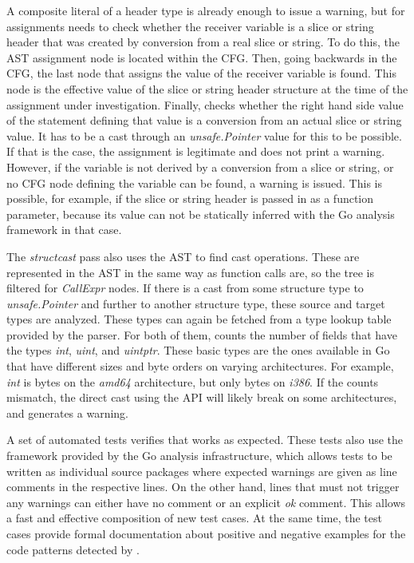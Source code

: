 

A composite literal of a header type is already enough to issue a warning, but for assignments \toolSafer{} needs to
check whether the receiver variable is a slice or string header that was created by conversion from a real slice or
string.
To do this, the \acrshort{AST} assignment node is located within the \acrshort{CFG}.
Then, going backwards in the \acrshort{CFG}, the last node that assigns the value of the receiver variable is found.
This node is the effective value of the slice or string header structure at the time of the assignment under
investigation.
Finally, \toolSafer{} checks whether the right hand side value of the statement defining that value is a conversion
from an actual slice or string value.
It has to be a cast through an \textit{unsafe.Pointer} value for this to be possible.
If that is the case, the assignment is legitimate and \toolSafer{} does not print a warning.
However, if the variable is not derived by a conversion from a slice or string, or no \acrshort{CFG} node defining the
variable can be found, a warning is issued.
This is possible, for example, if the slice or string header is passed in as a function parameter, because
its value can not be statically inferred with the Go analysis framework in that case.

The \textit{structcast} pass also uses the \acrshort{AST} to find cast operations.
These are represented in the \acrshort{AST} in the same way as function calls are, so the tree is filtered for
\textit{CallExpr} nodes.
If there is a cast from some structure type to \textit{unsafe.Pointer} and further to another structure type, these
source and target types are analyzed.
These types can again be fetched from a type lookup table provided by the parser.
For both of them, \toolSafer{} counts the number of fields that have the types \textit{int}, \textit{uint}, and
\textit{uintptr}.
These  basic types are the ones available in Go that have different sizes and byte orders on varying
architectures.
For example, \textit{int} is  bytes on the \textit{amd64} architecture, but only  bytes
on \textit{i386}.
If the counts mismatch, the direct cast using the \unsafe{} \acrshort{API} will likely break on some architectures,
and \toolSafer{} generates a warning.

A set of automated tests verifies that \toolSafer{} works as expected.
These tests also use the framework provided by the Go analysis infrastructure, which allows tests to be written as
individual source packages where expected warnings are given as line comments in the respective lines.
On the other hand, lines that must not trigger any warnings can either have no comment or an explicit \textit{ok}
comment.
This allows a fast and effective composition of new test cases.
At the same time, the test cases provide formal documentation about positive and negative examples for the code patterns
detected by \toolSafer{}.


